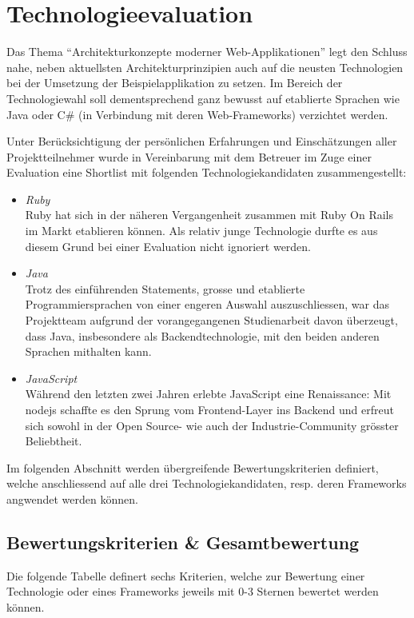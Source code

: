\section{Technologieevaluation}
\label{sec:technology-evaluation}

Das Thema ``Architekturkonzepte moderner Web-Applikationen'' legt den Schluss nahe, neben aktuellsten Architekturprinzipien auch auf die neusten Technologien bei der Umsetzung der Beispielapplikation zu setzen. Im Bereich der Technologiewahl soll dementsprechend ganz bewusst auf etablierte Sprachen wie Java oder C\# (in Verbindung mit deren Web-Frameworks) verzichtet werden.

Unter Berücksichtigung der persönlichen Erfahrungen und Einschätzungen aller Projektteilnehmer wurde in Vereinbarung mit dem Betreuer im Zuge einer Evaluation eine Shortlist mit folgenden Technologiekandidaten zusammengestellt:

\begin{itemize}
	\item \emph{Ruby}\\
	Ruby hat sich in der näheren Vergangenheit zusammen mit Ruby On Rails im Markt etablieren können. Als relativ junge Technologie durfte es aus diesem Grund bei einer Evaluation nicht ignoriert werden.

	\item \emph{Java}\\
	Trotz des einführenden Statements, grosse und etablierte Programmiersprachen von einer engeren Auswahl auszuschliessen, war das Projektteam aufgrund der vorangegangenen Studienarbeit davon überzeugt, dass Java, insbesondere als Backendtechnologie, mit den beiden anderen Sprachen mithalten kann.

	\item \emph{JavaScript}\\
	Während den letzten zwei Jahren erlebte JavaScript eine Renaissance: Mit \gls{nodejs} schaffte es den Sprung vom Frontend-Layer ins Backend und erfreut sich sowohl in der Open Source- wie auch der Industrie-Community grösster Beliebtheit.
\end{itemize}

Im folgenden Abschnitt werden übergreifende Bewertungskriterien definiert, welche anschliessend auf alle drei Technologiekandidaten, resp. deren Frameworks angwendet werden können.

\newpage
\subsection{Bewertungskriterien \protect\& Gesamtbewertung}
Die folgende Tabelle definert sechs Kriterien, welche zur Bewertung einer Technologie oder eines Frameworks jeweils mit 0-3 Sternen bewertet werden können.

